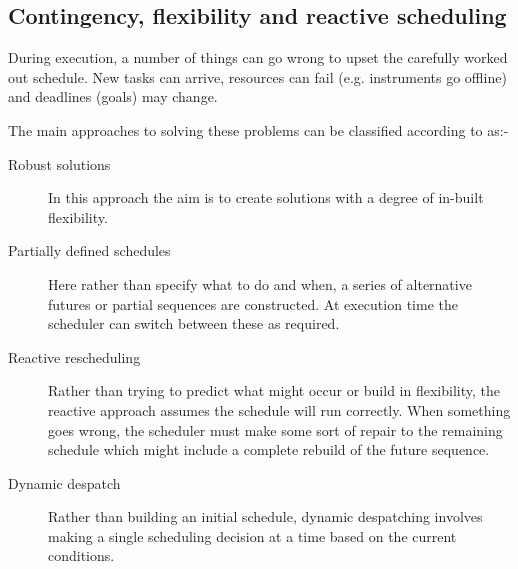 

%
%
\subsection{Contingency, flexibility and reactive scheduling}
\label{sub:review_flexible}
During execution, a number of things can go wrong to upset the carefully worked out schedule. New tasks can arrive, resources can fail (e.g. instruments go offline) and deadlines (goals) may change.

The main approaches to solving these problems can be classified according to \citet{policella03flexible} as:-

\begin{description}
\item[Robust solutions] In this approach the aim is to create solutions with a degree of in-built flexibility.

\item[Partially defined schedules] Here rather than specify what to do and when, a series of alternative futures or partial sequences are constructed. At execution time the scheduler can switch between these as required.

\item[Reactive rescheduling] Rather than trying to predict what might occur or build in flexibility, the reactive approach assumes the schedule will run correctly. When something goes wrong, the scheduler must make some sort of repair to the remaining schedule which might include a complete rebuild of the future sequence.

\item[Dynamic despatch] Rather than building an initial schedule, dynamic despatching involves making a single scheduling decision at a time based on the current conditions.

\end{description}


